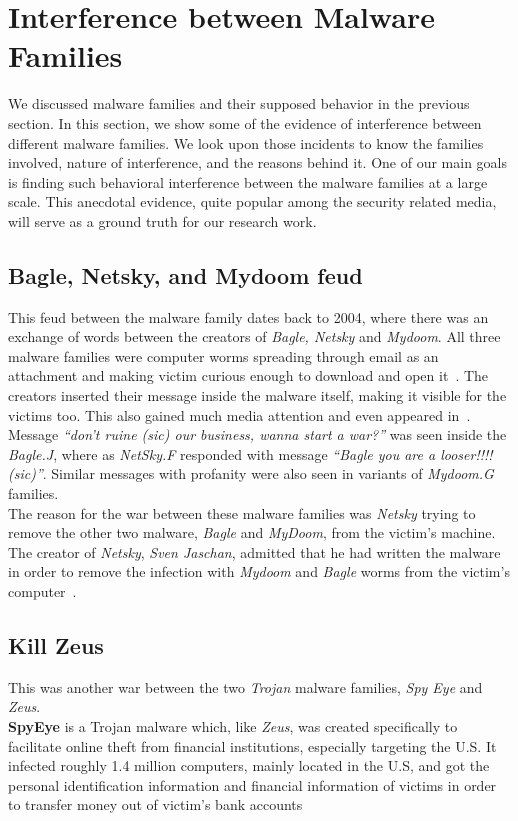\section{Interference between Malware Families}
\label{sec:Interference between Malware Families}
We discussed malware families and their supposed behavior in the previous section.
In this section, we show some of the evidence of interference between different malware families.
We look upon those incidents to know the families involved, nature of interference, and the reasons behind it.
One of our main goals is finding such behavioral interference between the malware families at a large scale.
This anecdotal evidence, quite popular among the security related media, will serve as a ground truth for our research work.
\subsection{Bagle, Netsky, and Mydoom feud}
\label{sub:Bagle, Netsky, and Mydoom feud}
This feud between the malware family dates back to 2004, where there was an exchange of words between the creators of \emph{Bagle, Netsky} and \emph{Mydoom}.
All three malware families were computer worms spreading through email as an attachment and making victim curious enough to download and open it~\cite[]{wikinetsky}.
The creators inserted their message inside the malware itself, making it visible for the victims too. This also gained much media attention and even appeared in~\cite[BBC]{bbccover}.
Message \emph{``don't ruine (sic) our business, wanna start a war?''} was seen inside the \emph{Bagle.J}, where as \emph{NetSky.F} responded with message \emph{``Bagle \- you are a looser!!!! (sic)''}.
Similar messages with profanity were also seen in variants of \emph{Mydoom.G} families.\\

The reason for the war between these malware families was \emph{Netsky} trying to remove the other two malware, \emph{Bagle} and \emph{MyDoom}, from the victim's machine.
The creator of \emph{Netsky}, \emph{Sven Jaschan}, admitted that he had written the malware in order to remove the infection with \emph{Mydoom} and \emph{Bagle} worms from the victim's computer~\cite[]{wikinetsky}.\\
\subsection{Kill Zeus}
\label{sub:Kill Zeus}
This was another war between the two \emph{Trojan} malware families, \emph{Spy Eye} and \emph{Zeus}.\\
\textbf{SpyEye} is a Trojan malware which, like \emph{Zeus}, was created specifically to facilitate online theft from financial institutions, especially targeting the U.S.
It infected roughly 1.4 million computers, mainly located in the U.S, and got the personal identification information and financial information of victims in order to transfer money out of victim's bank accounts~\cite[]{fbispyeye} \\

